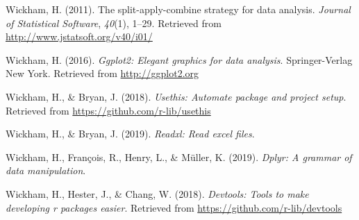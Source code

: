 \documentclass[man]{apa6}
\begin{document}
\leavevmode\hypertarget{ref-R-plyr}{}%
Wickham, H. (2011). The split-apply-combine strategy for data analysis. \emph{Journal of Statistical Software}, \emph{40}(1), 1--29. Retrieved from \url{http://www.jstatsoft.org/v40/i01/}

\leavevmode\hypertarget{ref-R-ggplot2}{}%
Wickham, H. (2016). \emph{Ggplot2: Elegant graphics for data analysis}. Springer-Verlag New York. Retrieved from \url{http://ggplot2.org}

\leavevmode\hypertarget{ref-R-usethis}{}%
Wickham, H., \& Bryan, J. (2018). \emph{Usethis: Automate package and project setup}. Retrieved from \url{https://github.com/r-lib/usethis}

\leavevmode\hypertarget{ref-R-readxl}{}%
Wickham, H., \& Bryan, J. (2019). \emph{Readxl: Read excel files}.

\leavevmode\hypertarget{ref-R-dplyr}{}%
Wickham, H., François, R., Henry, L., \& Müller, K. (2019). \emph{Dplyr: A grammar of data manipulation}.

\leavevmode\hypertarget{ref-R-devtools}{}%
Wickham, H., Hester, J., \& Chang, W. (2018). \emph{Devtools: Tools to make developing r packages easier}. Retrieved from \url{https://github.com/r-lib/devtools}

\endgroup
\end{document}
